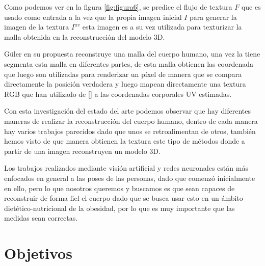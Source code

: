 Como podemos ver en la figura \ref{fig:figura6}, se predice el flujo de textura $F$ que es usado como  entrada a la vez que la propia imagen inicial $I$ para generar la imagen de la textura $I^{uv}$ esta imagen es a su vez utilizada para texturizar la malla obtenida en la reconstrucción del modelo 3D.


Güler en su propuesta reconstruye una malla del cuerpo humano, una vez la tiene segmenta esta malla en diferentes partes, de esta malla obtienen las coordenada que luego son utilizadas para renderizar un píxel de manera que se compara directamente la posición verdadera y luego mapean directamente una textura RGB que han utilizado de [\cite{Varol_2017}] a las coordenadas corporales UV estimadas.


Con esta investigación del estado del arte podemos observar que hay diferentes maneras de realizar la reconstrucción del cuerpo humano, dentro de cada manera hay varios trabajos parecidos dado que unos se retroalimentan de otros, también hemos visto de que manera obtienen la textura este tipo de métodos donde a partir de una imagen reconstruyen un modelo 3D. 

Los trabajos realizados mediante visión artificial y redes neuronales están más enfocados en general a las poses de las personas, dado que comenzó inicialmente en ello, pero lo que nosotros queremos y buscamos es que sean capaces de reconstruir de forma fiel el cuerpo dado que se busca usar esto en un ámbito dietético-nutricional de la obesidad, por lo que es muy importante que las medidas sean correctas.


\clearpage




\section{Objetivos}




